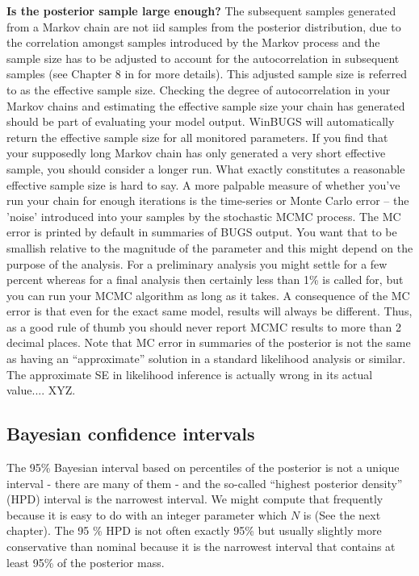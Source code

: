 {\bf Is the posterior sample large enough?}  The subsequent samples generated from a Markov chain are not iid samples from the posterior distribution, due to the correlation amongst samples introduced by the Markov process and the sample size has to be adjusted to account for the autocorrelation in subsequent samples (see Chapter 8 in \citet{robert_casella:2010} for more details). This adjusted sample size is referred to as the effective sample size. Checking the degree of autocorrelation in your Markov chains and estimating the effective sample size your chain has generated should be part of evaluating your model output. WinBUGS will automatically return the effective sample size for all monitored parameters. If you find that your supposedly long Markov chain has only generated a very short effective sample, you should consider a longer run. What exactly constitutes a reasonable effective sample size is hard to say. A more palpable measure of whether you've run your chain for enough iterations is the time-series or Monte Carlo error – the 'noise' introduced into your samples by the stochastic MCMC process. The MC error is printed by default in
summaries of BUGS output. You want that to be smallish relative to the
magnitude of the parameter and this might depend on the purpose of the
analysis. For a preliminary analysis you might settle for a few
percent whereas for a final analysis then certainly less than 1\% is
called for, but you can run
your MCMC
algorithm as long as it takes. A consequence of the MC error is that even for the exact same model, results will always be different. Thus, as a good rule
of thumb you should never report
MCMC results to more than 2 decimal places.
Note that MC error in summaries of the
posterior is not the same as having an ``approximate'' solution in a
standard likelihood analysis or similar.  The approximate SE in
likelihood inference is actually wrong in its actual value.... XYZ.


\subsection{Bayesian confidence intervals}

The 95\% Bayesian interval based on percentiles of the posterior
is not a unique interval - there are many of them - and the so-called
``highest posterior density'' (HPD) interval is the narrowest
interval. We might compute that frequently because it is easy to do
with an integer parameter which $N$ is (See the next chapter). The
95 \% HPD is not often exactly 95\% but usually slightly more
conservative than nominal because it is the narrowest interval that
contains at least 95\%  of the posterior mass.

